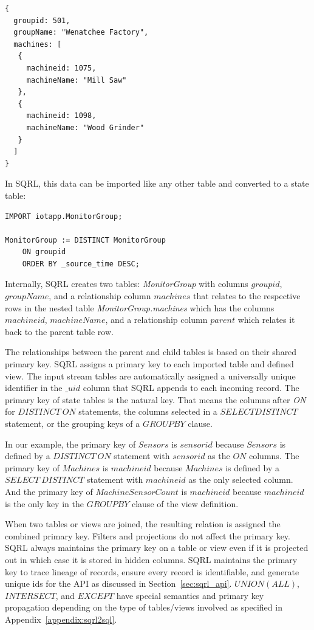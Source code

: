 \documentclass[	DIV=calc,%
							paper=letter,%
							fontsize=11pt,%
							twocolumn]{scrartcl}	 					%
\begin{document}
\begin{lstlisting}
{
  groupid: 501,
  groupName: "Wenatchee Factory",
  machines: [
   {
     machineid: 1075,
     machineName: "Mill Saw"
   },
   {
     machineid: 1098,
     machineName: "Wood Grinder"
   }
  ]
}
\end{lstlisting}

In SQRL, this data can be imported like any other table and converted to a state table:
\begin{lstlisting}
IMPORT iotapp.MonitorGroup;

MonitorGroup := DISTINCT MonitorGroup
    ON groupid
    ORDER BY _source_time DESC;
\end{lstlisting}

Internally, SQRL creates two tables: \emph{MonitorGroup} with columns $groupid$, $groupName$, and a relationship column $machines$ that relates to the respective rows in the nested table \emph{MonitorGroup.machines} which has the columns $machineid$, $machineName$, and a relationship column $parent$ which relates it back to the parent table row.

The relationships between the parent and child tables is based on their shared primary key. SQRL assigns a primary key to each imported table and defined view. The input stream tables are automatically assigned a universally unique identifier in the $\_uid$ column that SQRL appends to each incoming record. The primary key of state tables is the natural key. That means the columns after \emph{ON} for $DISTINCT\ ON$ statements, the columns selected in a $SELECT DISTINCT$ statement, or the grouping keys of a $GROUP BY$ clause.

In our example, the primary key of $Sensors$ is $sensorid$ because $Sensors$ is defined by a $DISTINCT\ ON$ statement with $sensorid$ as the $ON$ columns. The primary key of $Machines$ is $machineid$ because $Machines$ is defined by a $SELECT\ DISTINCT$ statement with $machineid$ as the only selected column. And the primary key of $MachineSensorCount$ is $machineid$ because $machineid$ is the only key in the $GROUP BY$ clause of the view definition.

When two tables or views are joined, the resulting relation is assigned the combined primary key. Filters and projections do not affect the primary key. SQRL always maintains the primary key on a table or view even if it is projected out in which case it is stored in hidden columns. SQRL maintains the primary key to trace lineage of records, ensure every record is identifiable, and generate unique ids for the API as discussed in Section~\ref{sec:sqrl_api}. $UNION (ALL)$, $INTERSECT$, and $EXCEPT$ have special semantics and primary key propagation depending on the type of tables/views involved as specified in Appendix~\ref{appendix:sqrl2sql}.
\end{document}
